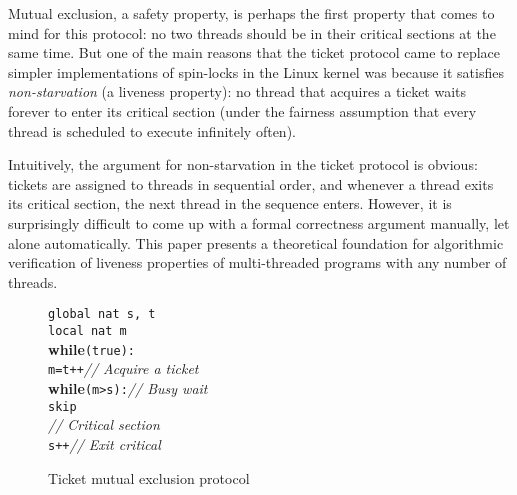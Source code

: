 \documentclass[9pt,nocopyrightspace]{sigplanconf}
\theoremstyle{definition}
\begin{document}
Mutual exclusion, a safety property, is perhaps the first property that comes
to mind for this protocol: no two threads should be in their critical sections
at the same time.  But one of the main reasons that the ticket protocol came
to replace simpler implementations of spin-locks in the Linux kernel was
because it satisfies \emph{non-starvation} \cite{ticket} (a liveness
property): no thread that acquires a ticket waits forever to enter its
critical section (under the fairness assumption that every thread is scheduled
to execute infinitely often).

Intuitively, the argument for non-starvation in the ticket protocol is
obvious: tickets are assigned to threads in sequential order, and whenever a
thread exits its critical section, the next thread in the sequence enters.
However, it is surprisingly difficult to come up with a formal correctness
argument manually, let alone automatically.  This paper presents a theoretical
foundation for algorithmic verification of liveness properties of
multi-threaded programs with any number of threads.

\begin{figure}
\begin{minipage}[b]{3.75cm}
  \noindent
\texttt{global nat s, t}\\
\texttt{local nat m}\\  
\textbf{while}\texttt{(true):}\\
\hspace*{0.25cm}\texttt{m=t++}\hfill{\textit{\color{gray}// Acquire a ticket}}\\
\hspace*{0.25cm}\textbf{while}\texttt{(m>s):}\hfill{\textit{\color{gray}// Busy wait}}\\
\hspace*{0.5cm}\texttt{skip}\\
\null\hfill{\textit{\color{red}// Critical section}}\\
\hspace*{0.25cm}\texttt{s++}\hfill{\textit{\color{gray}// Exit critical}}
\end{minipage}
\begin{minipage}[b]{4.5cm}
  \flushright
{}
\end{minipage}
\caption{Ticket mutual exclusion protocol \label{fig:ticket}}
\end{figure}
\end{document}
